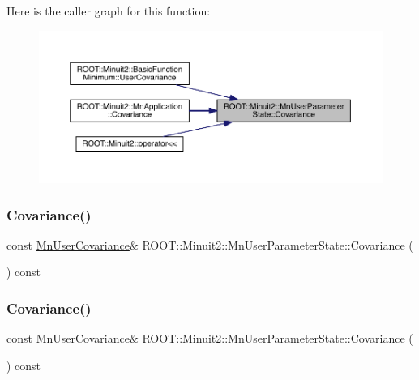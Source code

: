 Here is the caller graph for this function\+:
\nopagebreak
\begin{figure}[H]
\begin{center}
\leavevmode
\includegraphics[width=350pt]{d3/de0/classROOT_1_1Minuit2_1_1MnUserParameterState_a0e8ae6fe41fbc8eb1c218742ed080e0e_icgraph}
\end{center}
\end{figure}
\mbox{\label{classROOT_1_1Minuit2_1_1MnUserParameterState_a0e8ae6fe41fbc8eb1c218742ed080e0e}} 
\subsubsection{\texorpdfstring{Covariance()}{Covariance()}\hspace{0.1cm}{\footnotesize\ttfamily [2/3]}}
{\footnotesize\ttfamily const \mbox{\hyperlink{classROOT_1_1Minuit2_1_1MnUserCovariance}{Mn\+User\+Covariance}}\& R\+O\+O\+T\+::\+Minuit2\+::\+Mn\+User\+Parameter\+State\+::\+Covariance (\begin{DoxyParamCaption}{ }\end{DoxyParamCaption}) const\hspace{0.3cm}{\ttfamily [inline]}}

\mbox{\label{classROOT_1_1Minuit2_1_1MnUserParameterState_a0e8ae6fe41fbc8eb1c218742ed080e0e}} 
\subsubsection{\texorpdfstring{Covariance()}{Covariance()}\hspace{0.1cm}{\footnotesize\ttfamily [3/3]}}
{\footnotesize\ttfamily const \mbox{\hyperlink{classROOT_1_1Minuit2_1_1MnUserCovariance}{Mn\+User\+Covariance}}\& R\+O\+O\+T\+::\+Minuit2\+::\+Mn\+User\+Parameter\+State\+::\+Covariance (\begin{DoxyParamCaption}{ }\end{DoxyParamCaption}) const\hspace{0.3cm}{\ttfamily [inline]}}

